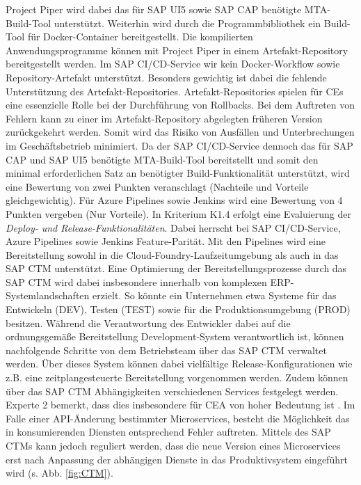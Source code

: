 Project Piper wird dabei das für SAP UI5 sowie SAP CAP benötigte MTA-Build-Tool unterstützt. Weiterhin wird durch die Programmbibliothek ein Build-Tool für Docker-Container bereitgestellt.  Die kompilierten Anwendungsprogramme können mit Project Piper in einem Artefakt-Repository bereitgestellt werden. Im SAP CI/CD-Service wir kein Docker-Workflow sowie Repository-Artefakt unterstützt. Besonders gewichtig ist dabei die fehlende Unterstützung des Artefakt-Repositories. Artefakt-Repositories spielen für CEs eine essenzielle Rolle bei der Durchführung von Rollbacks. Bei dem Auftreten von Fehlern kann zu einer im Artefakt-Repository abgelegten früheren Version zurückgekehrt werden. Somit wird das Risiko von Ausfällen und Unterbrechungen im Geschäftsbetrieb minimiert. Da der SAP CI/CD-Service dennoch das für SAP CAP und SAP UI5 benötigte MTA-Build-Tool bereitstellt und somit den minimal erforderlichen Satz an benötigter Build-Funktionalität unterstützt, wird eine Bewertung von zwei Punkten veranschlagt (Nachteile und Vorteile gleichgewichtig). Für Azure Pipelines sowie Jenkins wird eine Bewertung von 4 Punkten vergeben (Nur Vorteile). In Kriterium K1.4 erfolgt eine Evaluierung der \textit{Deploy- und Release-Funktionalitäten}. Dabei herrscht bei SAP CI/CD-Service, Azure Pipelines sowie Jenkins Feature-Parität. Mit den Pipelines wird eine Bereitstellung sowohl in die Cloud-Foundry-Laufzeitumgebung als auch in das SAP CTM unterstützt. Eine Optimierung der Bereitstellungsprozesse durch das SAP CTM wird dabei insbesondere innerhalb von komplexen ERP-Systemlandschaften erzielt. So könnte ein Unternehmen etwa Systeme für das Entwickeln (DEV), Testen (TEST) sowie für die Produktionsumgebung (PROD) besitzen. Während die Verantwortung des Entwickler dabei auf die ordnungsgemäße Bereitstellung Development-System verantwortlich ist, können nachfolgende Schritte von dem Betriebsteam über das SAP CTM verwaltet werden. Über dieses System können dabei vielfältige Release-Konfigurationen wie z.B. eine zeitplangesteuerte Bereitstellung vorgenommen werden. Zudem können über das SAP CTM Abhängigkeiten  verschiedenen Services festgelegt werden. Experte 2 bemerkt, dass dies insbesondere für CEA von hoher Bedeutung ist \cite[Z. 64]{ProductManagerSAPHyperspaceCICD.}. Im Falle einer API-Änderung bestimmter Microservices, besteht die Möglichkeit das in konsumierenden Diensten entsprechend Fehler auftreten. Mittels des SAP CTMs kann jedoch reguliert werden, dass die neue Version eines Microservices erst nach Anpassung der abhängigen Dienste in das Produktivsystem eingeführt wird (s. Abb. \ref*{fig:CTM}).
